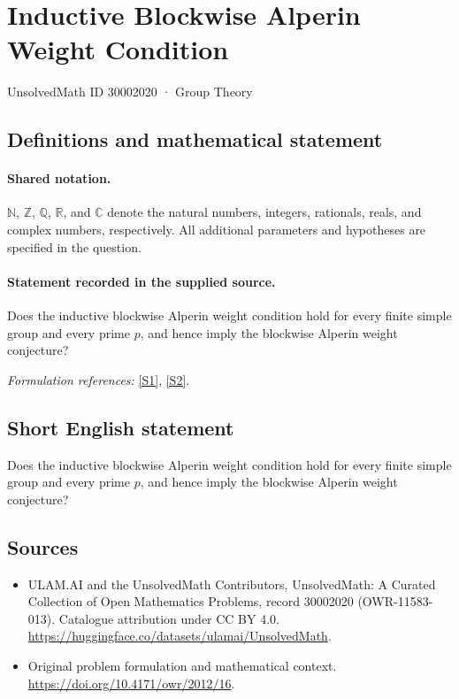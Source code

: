 \documentclass[11pt]{article}
\newcommand{\sref}[2]{\hyperlink{source:#1:#2}{[S#2]}}
\begin{document}
\setcounter{section}{30002019}
\section{Inductive Blockwise Alperin Weight Condition}\label{30002020}
{\small UnsolvedMath ID 30002020 · Group Theory}
\subsection{Definitions and mathematical statement}

\paragraph{Shared notation.}$\mathbb N$, $\mathbb Z$, $\mathbb Q$, $\mathbb R$, and $\mathbb C$ denote the natural numbers, integers, rationals, reals, and complex numbers, respectively. All additional parameters and hypotheses are specified in the question.


\paragraph{Statement recorded in the supplied source.}
Does the inductive blockwise Alperin weight condition hold for every finite simple group and every prime $p$, and hence imply the blockwise Alperin weight conjecture?
\par\smallskip\textit{Formulation references:} \sref{30002020}{1}, \sref{30002020}{2}.
\subsection{Short English statement}
Does the inductive blockwise Alperin weight condition hold for every finite simple group and every prime $p$, and hence imply the blockwise Alperin weight conjecture?
\subsection{Sources}
\begin{itemize}
\item[\hypertarget{source:30002020:1}{S1}] ULAM.AI and the UnsolvedMath Contributors, UnsolvedMath: A Curated Collection of Open Mathematics Problems, record 30002020 (OWR-11583-013). Catalogue attribution under CC BY 4.0.
\url{https://huggingface.co/datasets/ulamai/UnsolvedMath}.
\item[\hypertarget{source:30002020:2}{S2}] Original problem formulation and mathematical context.
\url{https://doi.org/10.4171/owr/2012/16}.
\end{itemize}
\label{end:30002020}
\end{document}
